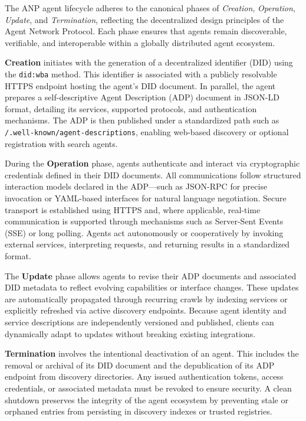 \documentclass{article}
\begin{document}
The ANP agent lifecycle adheres to the canonical phases of \textit{Creation}, \textit{Operation}, \textit{Update}, and \textit{Termination}, reflecting the decentralized design principles of the Agent Network Protocol. Each phase ensures that agents remain discoverable, verifiable, and interoperable within a globally distributed agent ecosystem.

\textbf{Creation} initiates with the generation of a decentralized identifier (DID) using the \texttt{did:wba} method. This identifier is associated with a publicly resolvable HTTPS endpoint hosting the agent’s DID document. In parallel, the agent prepares a self-descriptive Agent Description (ADP) document in JSON-LD format, detailing its services, supported protocols, and authentication mechanisms. The ADP is then published under a standardized path such as \texttt{/.well-known/agent-descriptions}, enabling web-based discovery or optional registration with search agents.

During the \textbf{Operation} phase, agents authenticate and interact via cryptographic credentials defined in their DID documents. All communications follow structured interaction models declared in the ADP—such as JSON-RPC for precise invocation or YAML-based interfaces for natural language negotiation. Secure transport is established using HTTPS and, where applicable, real-time communication is supported through mechanisms such as Server-Sent Events (SSE) or long polling. Agents act autonomously or cooperatively by invoking external services, interpreting requests, and returning results in a standardized format.

The \textbf{Update} phase allows agents to revise their ADP documents and associated DID metadata to reflect evolving capabilities or interface changes. These updates are automatically propagated through recurring crawls by indexing services or explicitly refreshed via active discovery endpoints. Because agent identity and service descriptions are independently versioned and published, clients can dynamically adapt to updates without breaking existing integrations.

\textbf{Termination} involves the intentional deactivation of an agent. This includes the removal or archival of its DID document and the depublication of its ADP endpoint from discovery directories. Any issued authentication tokens, access credentials, or associated metadata must be revoked to ensure security. A clean shutdown preserves the integrity of the agent ecosystem by preventing stale or orphaned entries from persisting in discovery indexes or trusted registries.
\end{document}
